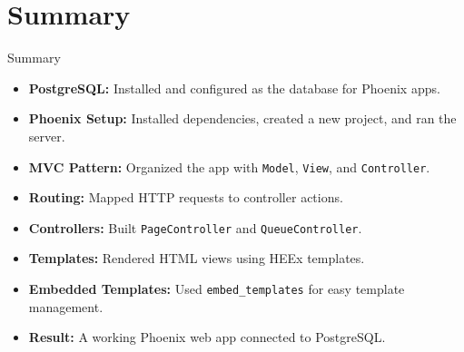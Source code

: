 \documentclass[aspectratio=169, table]{beamer}
\begin{document}
\section{Summary}
\begin{frame}[fragile]{Summary}
\vspace{20pt}

\begin{itemize}
  \item \textbf{PostgreSQL:} Installed and configured as the database for Phoenix apps.
  \item \textbf{Phoenix Setup:} Installed dependencies, created a new project, and ran the server.
  \item \textbf{MVC Pattern:} Organized the app with \texttt{Model}, \texttt{View}, and \texttt{Controller}.
  \item \textbf{Routing:} Mapped HTTP requests to controller actions.
  \item \textbf{Controllers:} Built \texttt{PageController} and \texttt{QueueController}.
  \item \textbf{Templates:} Rendered HTML views using HEEx templates.
  \item \textbf{Embedded Templates:} Used \texttt{embed\_templates} for easy template management.
  \item \textbf{Result:} A working Phoenix web app connected to PostgreSQL.
\end{itemize}
\end{frame}
\end{document}
